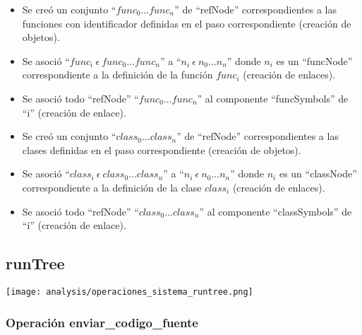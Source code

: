\begin{description}
\begin {itemize}
         \item Se creó un conjunto ``$func_0...func_n$'' de ``refNode'' correspondientes a las funciones con identificador definidas en el paso correspondiente (creación de objetos).
         \item Se asoció ``$func_i\ \epsilon\ func_0...func_n$'' a  ``$n_i\ \epsilon\ n_0...n_n$'' donde $n_i$ es un ``funcNode'' correspondiente a la definición de la función $func_i$ (creación de enlaces).
         \item Se asoció todo ``refNode'' ``$func_0...func_n$'' al componente ``funcSymbols'' de ``i'' (creación de enlace). 
         \item Se creó un conjunto ``$class_0...class_n$'' de ``refNode'' correspondientes a las clases definidas en el paso correspondiente (creación de objetos).
         \item Se asoció ``$class_i\ \epsilon\ class_0...class_n$'' a  ``$n_i\ \epsilon\ n_0...n_n$'' donde $n_i$ es un ``classNode'' correspondiente a la definición de la clase $class_i$ (creación de enlaces).
         \item Se asoció todo ``refNode'' ``$class_0...class_n$'' al componente ``classSymbols'' de ``i'' (creación de enlace). 
      \end{itemize}
	\end{description}

\subsection{runTree}
\begin{center}
\texttt{[image: analysis/operaciones\_sistema\_runtree.png]} 
\end{center}
\subsubsection{Operación enviar\_codigo\_fuente}

